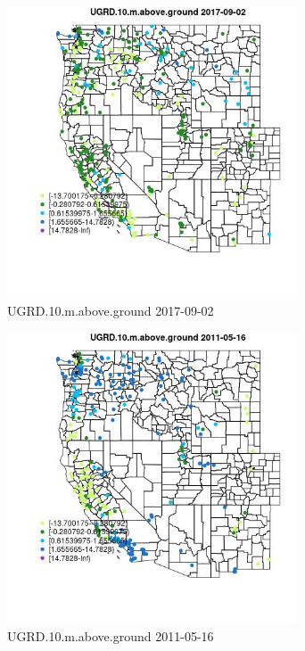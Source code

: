 \begin{figure} 
\centering  
\includegraphics[width=0.77\textwidth]{Code_Outputs/Report_ML_input_PM25_Step4_part_e_de_duplicated_aves_compiled_2019-05-20wNAs_MapObsUGRD10maboveground2017-09-02.jpg} 
\caption{\label{fig:Report_ML_input_PM25_Step4_part_e_de_duplicated_aves_compiled_2019-05-20wNAsMapObsUGRD10maboveground2017-09-02}UGRD.10.m.above.ground 2017-09-02} 
\end{figure} 
 

\clearpage 

\begin{figure} 
\centering  
\includegraphics[width=0.77\textwidth]{Code_Outputs/Report_ML_input_PM25_Step4_part_e_de_duplicated_aves_compiled_2019-05-20wNAs_MapObsUGRD10maboveground2011-05-16.jpg} 
\caption{\label{fig:Report_ML_input_PM25_Step4_part_e_de_duplicated_aves_compiled_2019-05-20wNAsMapObsUGRD10maboveground2011-05-16}UGRD.10.m.above.ground 2011-05-16} 
\end{figure} 
 


